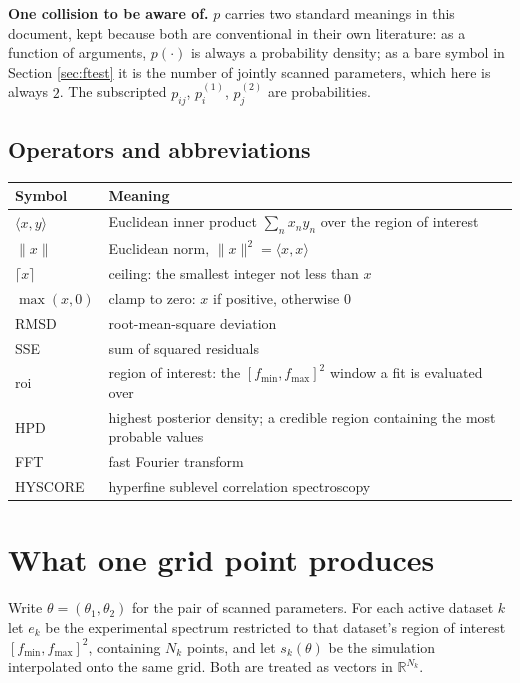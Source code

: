 \documentclass[11pt,a4paper]{article}
\begin{document}
\textbf{One collision to be aware of.} $p$ carries two standard meanings in
this document, kept because both are conventional in their own literature:
as a function of arguments, $p(\cdot)$ is always a probability density; as a
bare symbol in Section \ref{sec:ftest} it is the number of jointly scanned parameters,
which here is always $2$. The subscripted $p_{ij}$, $p^{(1)}_i$, $p^{(2)}_j$
are probabilities.

\subsection*{Operators and abbreviations}

\begin{tabular}{@{}l p{12.6cm}@{}}
\hline
Symbol & Meaning \\
\hline
$\langle x,y\rangle$ & Euclidean inner product $\sum_n x_n y_n$ over the region of interest \\
$\lVert x\rVert$ & Euclidean norm, $\lVert x\rVert^2=\langle x,x\rangle$ \\
$\lceil x\rceil$ & ceiling: the smallest integer not less than $x$ \\
$\max(x,0)$ & clamp to zero: $x$ if positive, otherwise $0$ \\
\hline
RMSD & root-mean-square deviation \\
SSE & sum of squared residuals \\
roi & region of interest: the $[f_{\min},f_{\max}]^2$ window a fit is evaluated over \\
HPD & highest posterior density; a credible region containing the most probable values \\
FFT & fast Fourier transform \\
HYSCORE & hyperfine sublevel correlation spectroscopy \\
\hline
\end{tabular}

\section{What one grid point produces}

Write $\theta=(\theta_1,\theta_2)$ for the pair of scanned parameters. For
each active dataset $k$ let $e_k$ be the experimental spectrum restricted to
that dataset's region of interest $[f_{\min},f_{\max}]^2$, containing $N_k$
points, and let $s_k(\theta)$ be the simulation interpolated onto the same
grid. Both are treated as vectors in $\mathbb{R}^{N_k}$.
\end{document}
